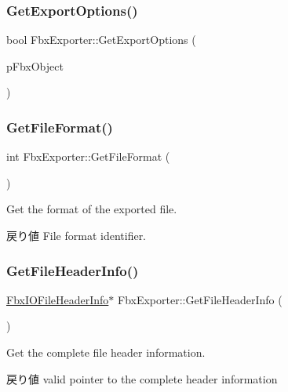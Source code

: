 \subsubsection{\texorpdfstring{Get\+Export\+Options()}{GetExportOptions()}\hspace{0.1cm}{\footnotesize\ttfamily [2/2]}}
{\footnotesize\ttfamily bool Fbx\+Exporter\+::\+Get\+Export\+Options (\begin{DoxyParamCaption}\item[{\hyperlink{class_fbx_i_o}{Fbx\+IO} $\ast$}]{p\+Fbx\+Object }\end{DoxyParamCaption})}

\mbox{\label{class_fbx_exporter_abd4308d309fb09113ebe6d7828691505}} 
\subsubsection{\texorpdfstring{Get\+File\+Format()}{GetFileFormat()}}
{\footnotesize\ttfamily int Fbx\+Exporter\+::\+Get\+File\+Format (\begin{DoxyParamCaption}{ }\end{DoxyParamCaption})}

Get the format of the exported file. \begin{DoxyReturn}{戻り値}
File format identifier. 
\end{DoxyReturn}
\mbox{\label{class_fbx_exporter_a9b219b2318ec3e5949a03b47e939251a}} 
\subsubsection{\texorpdfstring{Get\+File\+Header\+Info()}{GetFileHeaderInfo()}}
{\footnotesize\ttfamily \hyperlink{class_fbx_i_o_file_header_info}{Fbx\+I\+O\+File\+Header\+Info}$\ast$ Fbx\+Exporter\+::\+Get\+File\+Header\+Info (\begin{DoxyParamCaption}{ }\end{DoxyParamCaption})}

Get the complete file header information. \begin{DoxyReturn}{戻り値}
valid pointer to the complete header information 
\end{DoxyReturn}
\mbox{\label{class_fbx_exporter_a80853ac3257f1cfb95478f969bdc002a}} 

